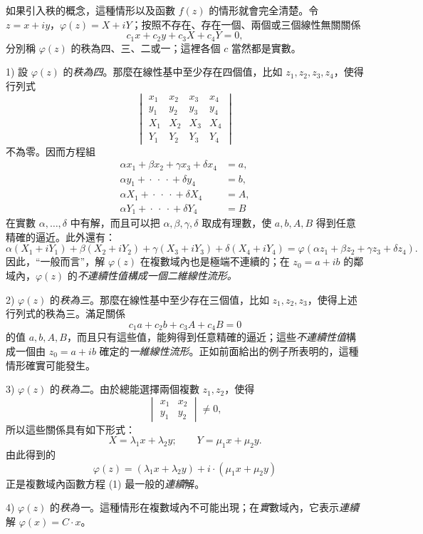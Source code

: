 \documentclass[11pt]{article}
\providecommand{\qtext}[1]{“#1”}
\begin{document}
如果引入秩的概念，這種情形以及函數 \(f(z)\) 的情形就會完全清楚。令 \(z=x+iy\)，\(\varphi(z)=X+iY\)；按照不存在、存在一個、兩個或三個線性無關關係
\[
c_1x+c_2y+c_3X+c_4Y=0,
\]
分別稱 \(\varphi(z)\) 的秩為四、三、二或一；這裡各個 \(c\) 當然都是實數。

1) 設 \(\varphi(z)\) 的\emph{秩為四}。那麼在線性基中至少存在四個值，比如 \(z_1,z_2,z_3,z_4\)，使得行列式
\[
\begin{vmatrix}
x_1&x_2&x_3&x_4\\
y_1&y_2&y_3&y_4\\
X_1&X_2&X_3&X_4\\
Y_1&Y_2&Y_3&Y_4
\end{vmatrix}
\]
不為零。因而方程組
\[
\begin{aligned}
\alpha x_1+\beta x_2+\gamma x_3+\delta x_4&=a,\\
\alpha y_1+{}\cdot{}\ \cdot{}\ \cdot{}+\delta y_4&=b,\\
\alpha X_1+{}\cdot{}\ \cdot{}\ \cdot{}+\delta X_4&=A,\\
\alpha Y_1+{}\cdot{}\ \cdot{}\ \cdot{}+\delta Y_4&=B
\end{aligned}
\]
在實數 \(\alpha,\ldots,\delta\) 中有解，而且可以把 \(\alpha,\beta,\gamma,\delta\) 取成有理數，使 \(a,b,A,B\) 得到任意精確的逼近。此外還有：
\[
\alpha(X_1+iY_1)+\beta(X_2+iY_2)+\gamma(X_3+iY_3)+\delta(X_4+iY_4)
 =\varphi(\alpha z_1+\beta z_2+\gamma z_3+\delta z_4).
\]
因此，\qtext{一般而言}，解 \(\varphi(z)\) 在複數域內也是極端不連續的；在 \(z_0=a+ib\) 的鄰域內，\(\varphi(z)\) 的\emph{不連續性值}\emph{構成一個二維線性流形。}

2) \(\varphi(z)\) 的\emph{秩為三}。那麼在線性基中至少存在三個值，比如 \(z_1,z_2,z_3\)，使得上述行列式的秩為三。滿足關係
\[
c_1a+c_2b+c_3A+c_4B=0
\]
的值 \(a,b,A,B\)，而且只有這些值，能夠得到任意精確的逼近；這些\emph{不連續性值}構成一個由 \(z_0=a+ib\) 確定的\emph{一維線性流形}。正如前面給出的例子所表明的，這種情形確實可能發生。

3) \(\varphi(z)\) 的\emph{秩為二}。由於總能選擇兩個複數 \(z_1,z_2\)，使得
\[
\begin{vmatrix}x_1&x_2\\ y_1&y_2\end{vmatrix}\ne0,
\]
所以這些關係具有如下形式：
\[
X=\lambda_1x+\lambda_2y;\qquad Y=\mu_1x+\mu_2y.
\]
由此得到的
\[
\varphi(z)=(\lambda_1x+\lambda_2y)+i\cdot(\mu_1x+\mu_2y)
\]
正是複數域內函數方程 (1) 最一般的\emph{連續}解。

4) \(\varphi(z)\) 的\emph{秩為一}。這種情形在複數域內不可能出現；在\emph{實}數域內，它表示\emph{連續}解 \(\varphi(x)=C\cdot x\)。
\end{document}
